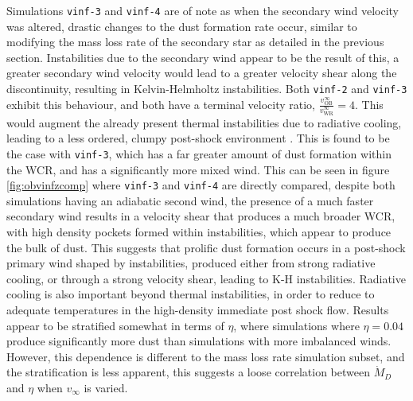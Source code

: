 Simulations \texttt{vinf-3} and \texttt{vinf-4} are of note as when the secondary wind velocity was altered, drastic changes to the dust formation rate occur, similar to modifying the mass loss rate of the secondary star as detailed in the previous section.
Instabilities due to the secondary wind appear to be the result of this, a greater secondary wind velocity would lead to a greater velocity shear along the discontinuity, resulting in Kelvin-Helmholtz instabilities.
Both \texttt{vinf-2} and \texttt{vinf-3} exhibit this behaviour, and both have a terminal velocity ratio, $\frac{v_\text{OB}^\infty}{v_\text{WR}^\infty} = 4$.
This would augment the already present thermal instabilities due to radiative cooling, leading to a less ordered, clumpy post-shock environment \parencite{stevens_colliding_1992}.
This is found to be the case with \texttt{vinf-3}, which has a far greater amount of dust formation within the WCR, and has a significantly more mixed wind.
This can be seen in figure \ref{fig:obvinfzcomp} where \texttt{vinf-3} and \texttt{vinf-4} are directly compared, despite both simulations having an adiabatic second wind, the presence of a much faster secondary wind results in a velocity shear that produces a much broader WCR, with high density pockets formed within instabilities, which appear to produce the bulk of dust. 
This suggests that prolific dust formation occurs in  a post-shock primary wind shaped by instabilities, produced either from strong radiative cooling, or through a strong velocity shear, leading to K-H instabilities.
Radiative cooling is also important beyond thermal instabilities, in order to reduce to adequate temperatures in the high-density immediate post shock flow.
Results appear to be stratified somewhat in terms of $\eta$, where simulations where $\eta = 0.04$ produce significantly more dust than simulations with more imbalanced winds.
However, this dependence is different to the mass loss rate simulation subset, and the stratification is less apparent, this suggests a loose correlation between $\dot M_D$ and $\eta$ when $v_\infty$ is varied.


